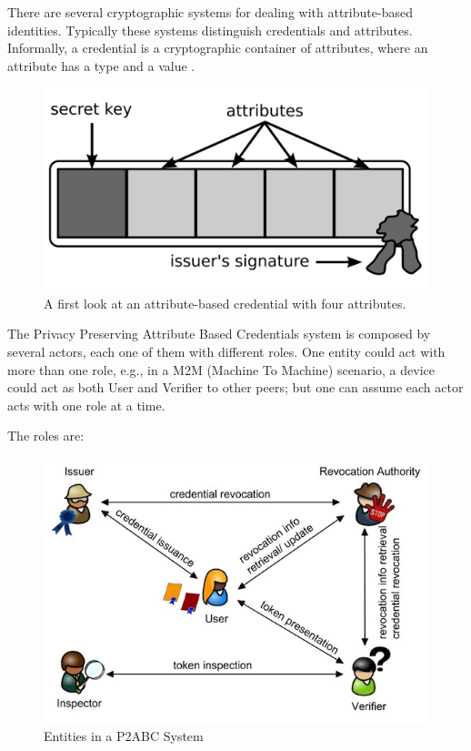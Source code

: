 There are several cryptographic systems for dealing with attribute-based
identities. Typically these systems distinguish credentials and attributes. Informally,
a credential is a cryptographic container of attributes, where an attribute has a type and a value \citep{vullers2013efficient}.

\begin{figure}[bth]
	\begin{center}
		\includegraphics[width=0.4\linewidth]{gfx/ABC}
	\end{center}
	\caption{A first look at an attribute-based credential with four attributes.}
	\label{fig:abc}
\end{figure}



The Privacy Preserving Attribute Based Credentials system is composed by several actors, each one of them with different roles. One entity could act with more than one role, e.g., in a M2M (Machine To Machine) scenario, a device could act as both User and Verifier to other peers; but one can assume each actor acts with one role at a time.


The roles are:


\begin{figure}[bth]
	\begin{center}
		\includegraphics[width=\linewidth]{gfx/actors}
	\end{center}
	\caption{Entities in a P2ABC System}
	\label{fig:actors}
\end{figure}

